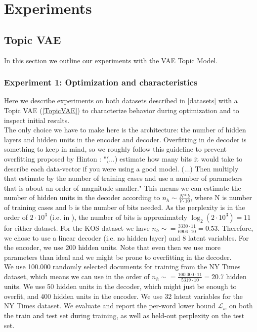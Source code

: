 \documentclass{report}
\begin{document}
	\section{Experiments}
	\subsection{Topic VAE}

	In this section we outline our experiments with the VAE Topic Model.  
	
	
	
	\subsubsection{Experiment 1: Optimization and characteristics}\label{exp1}
	
	Here we describe experiments on both datasets described in \ref{datasets} with a Topic VAE (\ref{TopicVAE}) to characterize behavior during optimization and to inspect initial results. \\
	The only choice we have to make here is the architecture: the number of hidden layers and hidden units in the encoder and decoder. Overfitting in de decoder is something to keep in mind, so we roughly follow this guideline to prevent overfitting proposed by Hinton \cite{hinton2012neural}: "(...) estimate how many bits it would take to describe each data-vector if you were using a good model. (...) Then multiply that estimate by the number of training cases and use a number of parameters that is about an order of magnitude smaller." This means we can estimate the number of hidden units in the decoder according to $n_h \sim \frac{N*b}{V \cdot 10}$, where N is number of training cases and b is the number of bits needed. As the perplexity is in the order of $2 \cdot 10^3$ (i.e. in \cite{ranganath2015deep}), the number of bits is approximately $\log_2(2 \cdot 10^3) = 11$ for either dataset. For the KOS dataset we have $n_h \sim = \frac{3330 \cdot 11}{6906\cdot 10} = 0.53$. Therefore, we chose to use a linear decoder (i.e. no hidden layer) and 8 latent variables. For the encoder, we use 200 hidden units. Note that even then we use more parameters than ideal and we might be prone to overfitting in the decoder. \\
	We use 100.000 randomly selected documents for training from the NY Times dataset, which means we can use in the order of $n_h \sim = \frac{100.000 \cdot 11}{5319\cdot 10} = 20.7$ hidden units. We use 50 hidden units in the decoder, which might just be enough to overfit, and 400 hidden units in the encoder. We use 32 latent variables for the NY Times dataset. We evaluate and report the per-word lower bound $\mathcal{L}_w$ on both the train and test set during training, as well as held-out perplexity on the test set. 
	
\end{document}
